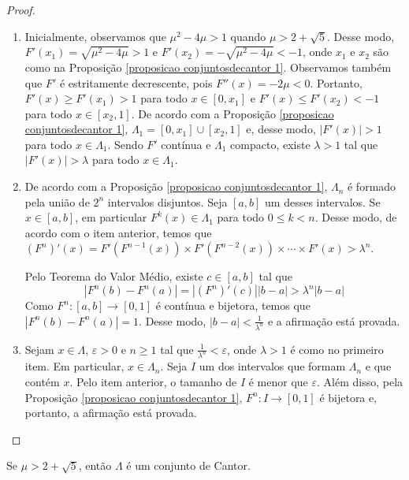 \begin{proof}
\begin{enumerate}
\item Inicialmente, observamos que $\mu^2 - 4\mu > 1$ quando $\mu > 2 + \sqrt{5}$. Desse modo, $F'(x_1) = \sqrt{\mu^2 - 4\mu} > 1$ e $F'(x_2) = -\sqrt{\mu^2 - 4\mu} < -1$, onde $x_1$ e $x_2$ são como na Proposição \ref{proposicao conjuntosdecantor 1}. Observamos também que $F'$ é estritamente decrescente, pois $F''(x) = -2\mu < 0$.  Portanto, $F'(x) \geq F'(x_1) > 1$ para todo $x \in [0, x_1]$ e $F'(x) \leq F'(x_2) < -1$ para todo $x \in [x_2, 1]$. De acordo com a Proposição \ref{proposicao conjuntosdecantor 1}, $\Lambda_1 = [0, x_1] \cup [x_2, 1]$ e, desse modo, $|F'(x)| > 1$ para todo $x \in \Lambda_1$. Sendo $F'$ contínua e $\Lambda_1$ compacto, existe $\lambda > 1$ tal que $|F'(x)| > \lambda$ para todo $x \in \Lambda_1$.

\item De acordo com a Proposição \ref{proposicao conjuntosdecantor 1}, $\Lambda_n$ é formado pela união de $2^n$ intervalos disjuntos. Seja $[a, b]$ um desses intervalos. Se $x \in [a, b]$, em particular $F^k(x) \in \Lambda_1$ para todo $0 \leq k < n$. Desse modo, de acordo com o item anterior, temos que $(F^n)'(x) = F'(F^{n-1}(x)) \times F'(F^{n-2}(x)) \times \cdots \times F'(x) > \lambda^n$.

Pelo Teorema do Valor Médio, existe $c \in [a, b]$ tal que $$|F^n(b) - F^n(a)| = |(F^n)'(c)||b - a| > \lambda^n|b - a|$$ Como $F^n: [a, b] \to [0 ,1]$ é contínua e bijetora, temos que $|F^n(b) - F^n(a)| = 1$. Desse modo, $|b - a| < \frac{1}{\lambda^n}$ e a afirmação está provada.

\item  Sejam $x \in \Lambda$, $\varepsilon > 0$ e $n \geq 1$ tal que $\frac{1}{\lambda^n} < \varepsilon$, onde $\lambda > 1$ é como no primeiro item. Em particular, $x \in \Lambda_n$. Seja $I$ um dos intervalos que formam $\Lambda_n$ e que contém $x$. Pelo item anterior, o tamanho de $I$ é menor que $\varepsilon$. Além disso, pela Proposição \ref{proposicao conjuntosdecantor 1}, $F^n: I \to [0,1]$ é bijetora e, portanto, a afirmação está provada.
\end{enumerate}
\end{proof} 

\begin{theorem}
\label{teorema conjuntosdecantor 1}
Se $\mu > 2 + \sqrt{5}$, então $\Lambda$ é um conjunto de Cantor.
\end{theorem}

